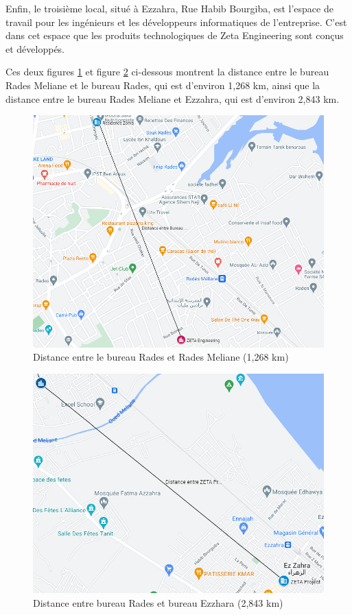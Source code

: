 Enfin, le troisième local, situé à Ezzahra, Rue Habib Bourgiba, est l'espace de travail pour les ingénieurs et les développeurs informatiques de l'entreprise. C'est dans cet espace que les produits technologiques de Zeta Engineering sont conçus et développés.

Ces deux figures \ref{Chap2.4.21} et figure \ref{Chap2.5.5} ci-dessous montrent la distance entre le bureau Rades Meliane et le bureau Rades, qui est d'environ 1,268 km, ainsi que la distance entre le bureau Rades Meliane et Ezzahra, qui est d'environ 2,843 km.

\begin{figure}[H]
\centering
\includegraphics[width=16cm]{Images/distance1.png}
\caption{Distance entre le bureau Rades et Rades Meliane (1,268 km)}
\label{Chap2.4.21}
\end{figure}


\begin{figure}[H]
 \centering
    \includegraphics[width=16cm]{Images/Distance2.png}
    \caption{Distance entre bureau Rades et bureau Ezzhara (2,843 km)}
    \label{Chap2.5.5}
\end{figure}    

